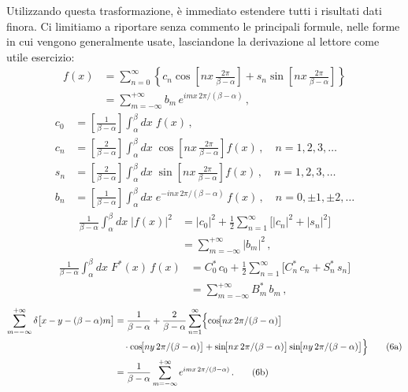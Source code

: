 \documentclass[11pt, a4paper]{book}
\numberwithin{equation}{section}
\begin{document}
Utilizzando questa trasformazione, è immediato estendere tutti i risultati dati finora. Ci limitiamo a riportare senza commento le principali formule, nelle forme in cui vengono generalmente usate, lasciandone la derivazione al lettore come utile esercizio:
\begin{align}
  f(x) &= \sum_{n=0}^{\infty}\left\{c_n\cos\!\left[nx\,\frac{2\pi}{\beta-\alpha}\right]
    + s_n\sin\!\left[nx\,\frac{2\pi}{\beta-\alpha}\right]\right\} \tag{2a}\\
  &= \sum_{m=-\infty}^{+\infty} b_m\,e^{imx\,2\pi/(\beta-\alpha)}\,, \tag{2b}
\end{align}
\begin{align}
  c_0 &= \left[\frac{1}{\beta-\alpha}\right]\int_\alpha^\beta dx\;f(x)\,, \tag{3a}\\
  c_n &= \left[\frac{2}{\beta-\alpha}\right]\int_\alpha^\beta dx\;\cos\!\left[nx\,\frac{2\pi}{\beta-\alpha}\right]f(x)\,,
    \quad n=1,2,3,\ldots \tag{3b}\\
  s_n &= \left[\frac{2}{\beta-\alpha}\right]\int_\alpha^\beta dx\;\sin\!\left[nx\,\frac{2\pi}{\beta-\alpha}\right]f(x)\,,
    \quad n=1,2,3,\ldots \tag{3c}\\
  b_n &= \left[\frac{1}{\beta-\alpha}\right]\int_\alpha^\beta dx\;e^{-inx\,2\pi/(\beta-\alpha)}\,f(x)\,,
    \quad n=0,\pm1,\pm2,\ldots \tag{3d}
\end{align}
\begin{align}
  \frac{1}{\beta-\alpha}\int_\alpha^\beta dx\;|f(x)|^2
  &= |c_0|^2 + \frac{1}{2}\sum_{n=1}^{\infty}\bigl[|c_n|^2+|s_n|^2\bigr] \tag{4a}\\
  &= \sum_{m=-\infty}^{+\infty}|b_m|^2\,, \tag{4b}
\end{align}
\begin{align}
  \frac{1}{\beta-\alpha}\int_\alpha^\beta dx\;F^*(x)\,f(x)
  &= C_0^*\,c_0 + \frac{1}{2}\sum_{n=1}^{\infty}\bigl[C_n^*\,c_n+S_n^*\,s_n\bigr] \tag{5a}\\
  &= \sum_{m=-\infty}^{+\infty} B_m^*\,b_m\,, \tag{5b}
\end{align}
\begin{align}
  \sum_{m=-\infty}^{+\infty}\delta\bigl[x-y-(\beta-\alpha)m\bigr]
  &= \frac{1}{\beta-\alpha} + \frac{2}{\beta-\alpha}\sum_{n=1}^{\infty}
    \Bigl\{\cos\!\bigl[nx\,2\pi/(\beta-\alpha)\bigr] \notag\\
  &\quad\cdot\cos\!\bigl[ny\,2\pi/(\beta-\alpha)\bigr]
    + \sin\!\bigl[nx\,2\pi/(\beta-\alpha)\bigr]\sin\!\bigl[ny\,2\pi/(\beta-\alpha)\bigr]\Bigr\} \tag{6a}\\
  &= \frac{1}{\beta-\alpha}\sum_{m=-\infty}^{+\infty}
    e^{imx\,2\pi/(\beta-\alpha)}\,. \tag{6b}
\end{align}
\end{document}
